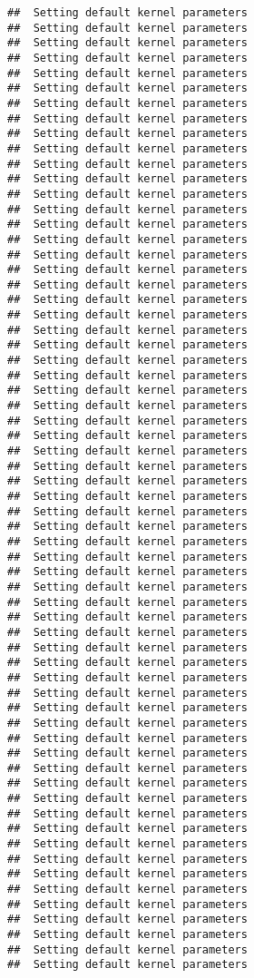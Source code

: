 \documentclass[
]{article}
\begin{document}
\begin{verbatim}
##  Setting default kernel parameters  
##  Setting default kernel parameters  
##  Setting default kernel parameters  
##  Setting default kernel parameters  
##  Setting default kernel parameters  
##  Setting default kernel parameters  
##  Setting default kernel parameters  
##  Setting default kernel parameters  
##  Setting default kernel parameters  
##  Setting default kernel parameters  
##  Setting default kernel parameters  
##  Setting default kernel parameters  
##  Setting default kernel parameters  
##  Setting default kernel parameters  
##  Setting default kernel parameters  
##  Setting default kernel parameters  
##  Setting default kernel parameters  
##  Setting default kernel parameters  
##  Setting default kernel parameters  
##  Setting default kernel parameters  
##  Setting default kernel parameters  
##  Setting default kernel parameters  
##  Setting default kernel parameters  
##  Setting default kernel parameters  
##  Setting default kernel parameters  
##  Setting default kernel parameters  
##  Setting default kernel parameters  
##  Setting default kernel parameters  
##  Setting default kernel parameters  
##  Setting default kernel parameters  
##  Setting default kernel parameters  
##  Setting default kernel parameters  
##  Setting default kernel parameters  
##  Setting default kernel parameters  
##  Setting default kernel parameters  
##  Setting default kernel parameters  
##  Setting default kernel parameters  
##  Setting default kernel parameters  
##  Setting default kernel parameters  
##  Setting default kernel parameters  
##  Setting default kernel parameters  
##  Setting default kernel parameters  
##  Setting default kernel parameters  
##  Setting default kernel parameters  
##  Setting default kernel parameters  
##  Setting default kernel parameters  
##  Setting default kernel parameters  
##  Setting default kernel parameters  
##  Setting default kernel parameters  
##  Setting default kernel parameters  
##  Setting default kernel parameters  
##  Setting default kernel parameters  
##  Setting default kernel parameters  
##  Setting default kernel parameters  
##  Setting default kernel parameters  
##  Setting default kernel parameters  
##  Setting default kernel parameters  
##  Setting default kernel parameters  
##  Setting default kernel parameters  
##  Setting default kernel parameters  
##  Setting default kernel parameters  
##  Setting default kernel parameters  
##  Setting default kernel parameters  
##  Setting default kernel parameters  

\end{verbatim}
\end{document}

